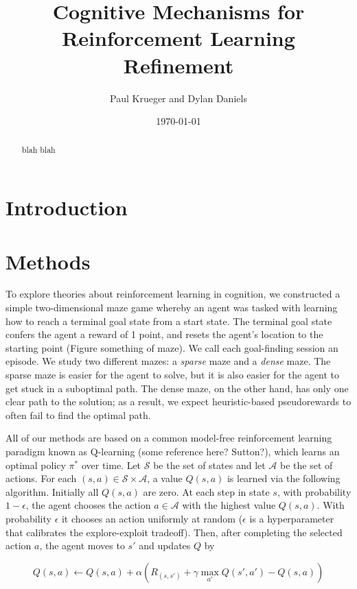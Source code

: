 \documentclass[notitlepage]{report}
\title{Cognitive Mechanisms for Reinforcement Learning Refinement}
\author{Paul Krueger and Dylan Daniels}
\date{\today}
\begin{document}
\maketitle

\begin{abstract}
blah blah
\end{abstract}

\section*{Introduction}

\section*{Methods}

To explore theories about reinforcement learning in cognition, we constructed a simple two-dimensional maze game whereby an agent was tasked with learning how to reach a terminal goal state from a start state. The terminal goal state confers the agent a reward of 1 point, and resets the agent's location to the starting point (Figure something of maze). We call each goal-finding session an episode. We study two different mazes: a \textit{sparse} maze and a \textit{dense} maze. The sparse maze is easier for the agent to solve, but it is also easier for the agent to get stuck in a suboptimal path. The dense maze, on the other hand, has only one clear path to the solution; as a result, we expect heuristic-based pseudorewards to often fail to find the optimal path.

All of our methods are based on a common model-free reinforcement learning paradigm known as Q-learning (some reference here? Sutton?), which learns an optimal policy $\pi^*$ over time. Let $\mathcal{S}$ be the set of states and let $\mathcal{A}$ be the set of actions. For each $(s,a) \in \mathcal{S} \times \mathcal{A}$, a value $Q(s,a)$ is learned via the following algorithm. Initially all $Q(s,a)$ are zero. At each step in state $s$, with probability $1 - \epsilon$, the agent chooses the action $a \in \mathcal{A}$ with the highest value $Q(s,a)$. With probability $\epsilon$ it chooses an action uniformly at random ($\epsilon$ is a hyperparameter that calibrates the explore-exploit tradeoff). Then, after completing the selected action $a$, the agent moves to $s'$ and updates $Q$ by

\begin{equation}
Q(s,a) \leftarrow Q(s,a) + \alpha (R_(s, s') + \gamma \max_{a'} Q(s', a') - Q(s,a))
\label{eq:q-learn}
\end{equation}
\end{document}
